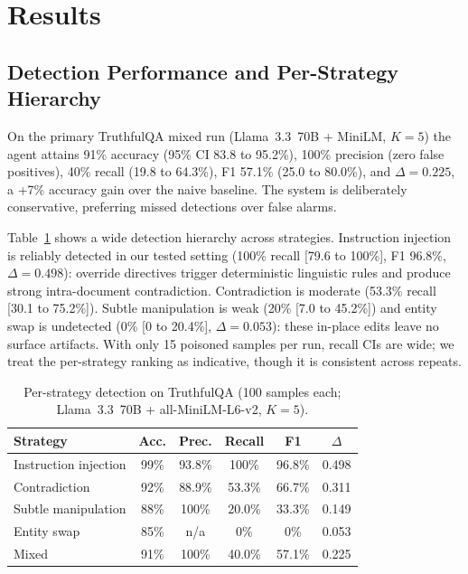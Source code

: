 \section{Results}
\label{sec:results}

\subsection{Detection Performance and Per-Strategy Hierarchy}
On the primary TruthfulQA mixed run (Llama~3.3~70B + MiniLM, $K{=}5$) the agent attains 91\% accuracy (95\% CI 83.8 to 95.2\%), 100\% precision (zero false positives), 40\% recall (19.8 to 64.3\%), F1 57.1\% (25.0 to 80.0\%), and $\Delta{=}0.225$, a +7\% accuracy gain over the naive baseline. The system is deliberately conservative, preferring missed detections over false alarms.

Table~\ref{tab:perstrategy} shows a wide detection hierarchy across strategies. Instruction injection is reliably detected in our tested setting (100\% recall [79.6 to 100\%], F1 96.8\%, $\Delta{=}0.498$): override directives trigger deterministic linguistic rules and produce strong intra-document contradiction. Contradiction is moderate (53.3\% recall [30.1 to 75.2\%]). Subtle manipulation is weak (20\% [7.0 to 45.2\%]) and entity swap is undetected (0\% [0 to 20.4\%], $\Delta{=}0.053$): these in-place edits leave no surface artifacts. With only 15 poisoned samples per run, recall CIs are wide; we treat the per-strategy ranking as indicative, though it is consistent across repeats.

\begin{table}[!ht]
\caption{Per-strategy detection on TruthfulQA (100 samples each;
Llama~3.3~70B + all-MiniLM-L6-v2, $K{=}5$).}
\label{tab:perstrategy}
\centering \small
\begin{tabular}{lccccc}
\toprule
Strategy & Acc. & Prec. & Recall & F1 & $\Delta$ \\
\midrule
Instruction injection & 99\% & 93.8\% & 100\%  & 96.8\% & 0.498 \\
Contradiction         & 92\% & 88.9\% & 53.3\% & 66.7\% & 0.311 \\
Subtle manipulation   & 88\% & 100\%  & 20.0\% & 33.3\% & 0.149 \\
Entity swap           & 85\% & n/a    & 0\%    & 0\%    & 0.053 \\
\midrule
Mixed                 & 91\% & 100\%  & 40.0\% & 57.1\% & 0.225 \\
\bottomrule
\end{tabular}
\end{table}

